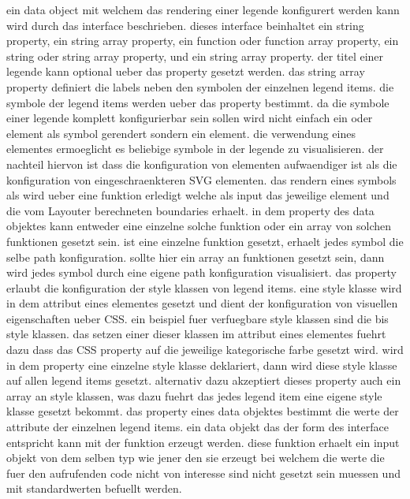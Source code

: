 ein data object mit welchem das rendering einer legende konfigurert werden kann wird durch das  interface beschrieben.
dieses interface beinhaltet ein  string property, ein  string array property, ein  function oder function array property, ein  string oder string array property, und ein  string array property.
der titel einer legende kann optional ueber das  property gesetzt werden.
das  string array property definiert die labels neben den symbolen der einzelnen legend items.
die symbole der legend items werden ueber das  property bestimmt.
da die symbole einer legende komplett konfigurierbar sein sollen wird nicht einfach ein  oder  element als symbol gerendert sondern ein  element.
die verwendung eines  elementes ermoeglicht es beliebige symbole in der legende zu visualisieren.
der nachteil hiervon ist dass die konfiguration von  elementen aufwaendiger ist als die konfiguration von eingeschraenkteren SVG elementen.
das rendern eines symbols als  wird ueber eine funktion erledigt welche als input das jeweilige  element und die vom Layouter berechneten boundaries erhaelt.
in dem  property des  data objektes kann entweder eine einzelne solche funktion oder ein array von solchen funktionen gesetzt sein.
ist eine einzelne funktion gesetzt, erhaelt jedes symbol die selbe path konfiguration. 
sollte hier ein array an funktionen gesetzt sein, dann wird jedes symbol durch eine eigene path konfiguration visualisiert.
das  property erlaubt die konfiguration der style klassen von legend items.
eine style klasse wird in dem  attribut eines elementes gesetzt und dient der konfiguration von visuellen eigenschaften ueber CSS.
ein beispiel fuer verfuegbare style klassen sind die  bis  style klassen.
das setzen einer dieser klassen im  attribut eines elementes fuehrt dazu dass das CSS  property auf die jeweilige kategorische farbe gesetzt wird.  
wird in dem  property eine einzelne style klasse deklariert, dann wird diese style klasse auf allen legend items gesetzt.
alternativ dazu akzeptiert dieses property auch ein array an style klassen, was dazu fuehrt das jedes legend item eine eigene style klasse gesetzt bekommt.
das  property eines  data objektes bestimmt die werte der  attribute der einzelnen legend items.
ein data objekt das der form des  interface entspricht kann mit der  funktion erzeugt werden.
diese funktion erhaelt ein input objekt von dem selben typ wie jener den sie erzeugt bei welchem die werte die fuer den aufrufenden code nicht von interesse sind nicht gesetzt sein muessen und mit standardwerten befuellt werden.

